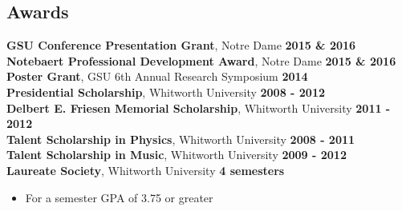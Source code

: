 \documentclass[margin]{res}
\begin{document}
\begin{resume}







\section{Awards}
{\bf GSU Conference Presentation Grant}, Notre Dame  \hfill {\bf 2015 \& 2016}  \\
{\bf Notebaert Professional Development Award}, Notre Dame  \hfill {\bf 2015 \& 2016}  \\
{\bf Poster Grant}, GSU 6th Annual Research Symposium \hfill {\bf 2014}  \\
{\bf Presidential Scholarship}, Whitworth University \hfill {\bf2008 - 2012} \\
{\bf Delbert E. Friesen Memorial Scholarship}, Whitworth University \hfill {\bf2011 - 2012} \\
{\bf Talent Scholarship in Physics}, Whitworth University \hfill {\bf2008 - 2011} \\
{\bf Talent Scholarship in Music}, Whitworth University \hfill {\bf2009 - 2012} \\
{\bf Laureate Society}, Whitworth University \hfill {\bf4 semesters}
\begin{itemize}  \itemsep -2pt %
     \item[] For a semester GPA of 3.75 or greater
\end{itemize}









\end{resume}
\end{document}
